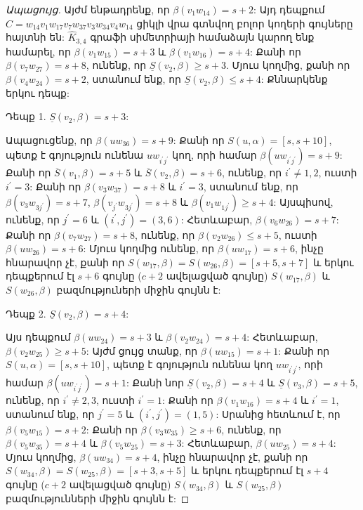 \begin{hide}
\begin{proof}[Ապացույց]
Այժմ ենթադրենք, որ $\beta(v_{1}w_{14})=s+2$: Այդ դեպքում 
$C=w_{14}v_{1}w_{17}v_{7}w_{37}v_{3}w_{34}v_{4}w_{14}$ ցիկլի վրա գտնվող բոլոր կողերի գույները հայտնի են: $\widehat{K}_{3,4}$ գրաֆի սիմետրիայի համաձայն կարող ենք համարել, որ $\beta(v_{1}w_{15})=s+3$ և $\beta(v_{1}w_{16})=s+4$:
Քանի որ $\beta(v_{7}w_{27})=s+8$, ունենք, որ $\underline{S}(v_{2},\beta)\geq
s+3$. Մյուս կողմից, քանի որ $\beta(v_{4}w_{24})=s+2$, ստանում ենք, որ
$\underline{S}(v_{2},\beta)\leq s+4$: Քննարկենք երկու դեպք:

Դեպք 1. $\underline{S}(v_{2},\beta)= s+3$:

Ապացուցենք, որ $\beta(uw_{36})= s+9$: Քանի որ
$S(u,\alpha)=[s,s+10]$, պետք է գոյություն ունենա 
$uw_{i^{\prime}j^{\prime}}$ կող, որի համար
$\beta\left(uw_{i^{\prime}j^{\prime}}\right)=s+9$: Քանի որ $\overline{S}(v_{1},\beta)= s+5$ և $\overline{S}(v_{2},\beta)= s+6$, ունենք, որ
$i^{\prime}\neq 1,2$, ուստի $i^{\prime}=3$: Քանի որ
$\beta(v_{3}w_{37})= s+8$ և $i^{\prime}=3$, ստանում ենք, որ
$\beta(v_{3}w_{3j^{\prime}})= s+7$,
$\beta(v_{j^{\prime}}w_{3j^{\prime}})= s+8$ և
$\beta(v_{1}w_{1j^{\prime}})\geq s+4$: Այսպիսով, ունենք, որ $j^{\prime}=6$
և $\left(i^{\prime},j^{\prime}\right)=(3,6)$: Հետևաբար, 
$\beta(v_{6}w_{26})= s+7$: Քանի որ $\beta(v_{7}w_{27})= s+8$, ունենք, որ
$\beta(v_{2}w_{26})\leq s+5$, ուստի $\beta(uw_{26})= s+6$: Մյուս կողմից ունենք, որ $\beta(uw_{17})= s+6$, ինչը հնարավոր չէ,
քանի որ $S(w_{17},\beta)=S(w_{26},\beta)=[s+5,s+7]$ և երկու դեպքերում էլ $s+6$ գույնը ($c+2$ ավելացված գույնը) 
$S(w_{17},\beta)$ և $S(w_{26},\beta)$ բազմություների միջին գույնն է:

Դեպք 2. $\underline{S}(v_{2},\beta)= s+4$:

Այս դեպքում $\beta(uw_{24})=s+3$ և $\beta(v_{2}w_{24})= s+4$:
Հետևաբար, $\beta(v_{2}w_{25})\geq s+5$: Այժմ ցույց տանք, որ
$\beta(uw_{15})= s+1$: Քանի որ $S(u,\alpha)=[s,s+10]$, պետք է գոյություն ունենա կող $uw_{i^{\prime}j^{\prime}}$, որի համար
$\beta\left(uw_{i^{\prime}j^{\prime}}\right)=s+1$: Քանի նոր $\underline{S}(v_{2},\beta)= s+4$ և $\underline{S}(v_{3},\beta)= s+5$, ունենք, որ
$i^{\prime}\neq 2,3$, ուստի $i^{\prime}=1$: Քանի որ
$\beta(v_{1}w_{16})=s+4$ և $i^{\prime}=1$, ստանում ենք, որ
$j^{\prime}=5$ և $\left(i^{\prime},j^{\prime}\right)=(1,5)$: Սրանից հետևում է, որ $\beta(v_{5}w_{15})= s+2$: Քանի որ
$\beta(v_{3}w_{35})\geq s+6$, ունենք, որ $\beta(v_{5}w_{35})= s+4$ և
$\beta(v_{5}w_{25})= s+3$: Հետևաբար, $\beta(uw_{25})= s+4$:
Մյուս կողմից, $\beta(uw_{34})= s+4$, ինչը հնարավոր չէ, քանի որ $S(w_{34},\beta)=S(w_{25},\beta)=[s+3,s+5]$ և
երկու դեպքերում էլ $s+4$ գույնը ($c+2$ ավելացված գույնը) $S(w_{34},\beta)$ և $S(w_{25},\beta)$ բազմությունների միջին գույնն է:
\end{proof}
\end{hide}